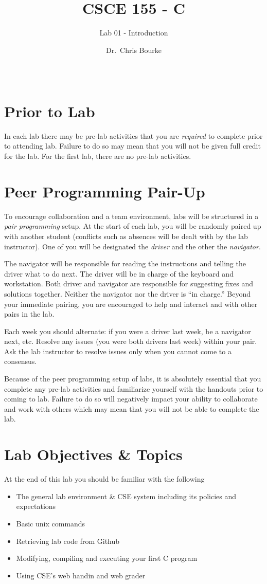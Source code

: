 \documentclass[12pt]{scrartcl}
\title{CSCE 155 - C}
\subtitle{Lab 01 - Introduction}
\author{Dr.\ Chris Bourke}
\date{~}
\begin{document}
\maketitle

\section*{Prior to Lab}

In each lab there may be pre-lab activities that you are \emph{required} to
complete prior to attending lab.  Failure to do so may mean that you will
not be given full credit for the lab.  For the first lab, there are no pre-lab
activities.

\section*{Peer Programming Pair-Up}

To encourage collaboration and a team environment, labs will be
structured in a \emph{pair programming} setup.  At the start of
each lab, you will be randomly paired up with another student 
(conflicts such as absences will be dealt with by the lab instructor).
One of you will be designated the \emph{driver} and the other
the \emph{navigator}.  

The navigator will be responsible for reading the instructions and
telling the driver what to do next.  The driver will be in charge of the
keyboard and workstation.  Both driver and navigator are responsible
for suggesting fixes and solutions together.  Neither the navigator
nor the driver is ``in charge.''  Beyond your immediate pairing, you
are encouraged to help and interact and with other pairs in the lab.

Each week you should alternate: if you were a driver last week, 
be a navigator next, etc.  Resolve any issues (you were both drivers
last week) within your pair.  Ask the lab instructor to resolve issues
only when you cannot come to a consensus.  

Because of the peer programming setup of labs, it is absolutely 
essential that you complete any pre-lab activities and familiarize
yourself with the handouts prior to coming to lab.  Failure to do
so will negatively impact your ability to collaborate and work with 
others which may mean that you will not be able to complete the
lab.  

\section{Lab Objectives \& Topics}
At the end of this lab you should be familiar with the following
\begin{itemize}
  \item The general lab environment \& CSE system including its policies and expectations
  \item Basic unix commands
  \item Retrieving lab code from Github
  \item Modifying, compiling and executing your first C program
  \item Using CSE's web handin and web grader
\end{itemize}
\end{document}
